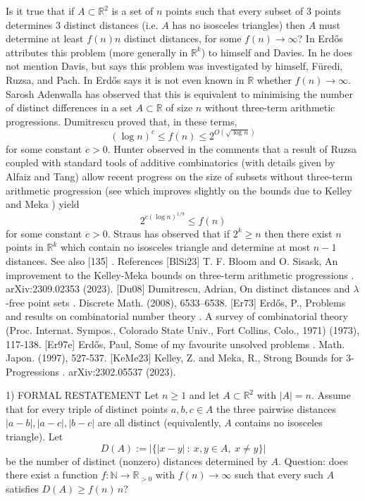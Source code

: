 Is it true that if $A\subset \mathbb{R}^2$ is a set of $n$ points such that every subset of $3$ points determines $3$ distinct distances (i.e. $A$ has no isosceles triangles) then $A$ must determine at least $f(n)n$ distinct distances, for some $f(n)\to \infty$? In \cite{Er73} Erd\H{o}s attributes this problem (more generally in $\mathbb{R}^k$) to himself and Davies. In \cite{Er97e} he does not mention Davis, but says this problem was investigated by himself, F\"{u}redi, Ruzsa, and Pach. In \cite{Er73} Erd\H{o}s says it is not even known in $\mathbb{R}$ whether $f(n)\to \infty$. Sarosh Adenwalla has observed that this is equivalent to minimising the number of distinct differences in a set $A\subset \mathbb{R}$ of size $n$ without three-term arithmetic progressions. Dumitrescu \cite{Du08} proved that, in these terms,\[(\log n)^c \leq f(n) \leq 2^{O(\sqrt{\log n})}\]for some constant $c>0$. Hunter observed in the comments that a result of Ruzsa coupled with standard tools of additive combinatorics (with details given by Alfaiz and Tang) allow recent progress on the size of subsets without three-term arithmetic progression (see \cite{BlSi23} which improves slightly on the bounds due to Kelley and Meka \cite{KeMe23}) yield\[2^{c(\log n)^{1/9}}\leq f(n)\]for some constant $c>0$. Straus has observed that if $2^k\geq n$ then there exist $n$ points in $\mathbb{R}^k$ which contain no isosceles triangle and determine at most $n-1$ distances. See also [135] . References [BlSi23] T. F. Bloom and O. Sisask, An improvement to the Kelley-Meka bounds on three-term arithmetic progressions . arXiv:2309.02353 (2023). [Du08] Dumitrescu, Adrian, On distinct distances and {$\lambda$}-free point sets . Discrete Math. (2008), 6533--6538. [Er73] Erd\H{o}s, P., Problems and results on combinatorial number theory . A survey of combinatorial theory (Proc. Internat. Sympos., Colorado State Univ., Fort Collins, Colo., 1971) (1973), 117-138. [Er97e] Erd\H{o}s, Paul, Some of my favourite unsolved problems . Math. Japon. (1997), 527-537. [KeMe23] Kelley, Z. and Meka, R., Strong Bounds for 3-Progressions . arXiv:2302.05537 (2023).


1) FORMAL RESTATEMENT
Let $n\ge 1$ and let $A\subset\mathbb{R}^2$ with $|A|=n$.
Assume that for every triple of distinct points $a,b,c\in A$ the three pairwise distances
$|a-b|,|a-c|,|b-c|$ are all distinct (equivalently, $A$ contains no isosceles triangle).
Let
\[
D(A):=\bigl|\bigl\{|x-y|\ :\ x,y\in A,\ x\neq y\bigr\}\bigr|
\]
be the number of distinct (nonzero) distances determined by $A$.
Question: does there exist a function $f:\mathbb{N}\to\mathbb{R}_{>0}$ with $f(n)\to\infty$
such that every such $A$ satisfies $D(A)\ge f(n)\,n$?

